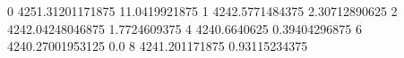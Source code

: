 0 4251.31201171875 11.0419921875
1 4242.5771484375 2.30712890625
2 4242.04248046875 1.7724609375
4 4240.6640625 0.39404296875
6 4240.27001953125 0.0
8 4241.201171875 0.93115234375

